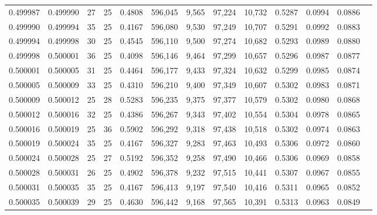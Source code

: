 \begin{tabular}{rrrrrrrrrrrrr}
0.499987 & 0.499990 &    27 &  25 &                                     0.4808 & 596,045 &   9,565 &  97,224 &  10,732 & 0.5287 & 0.0994 & 0.0886 \\
0.499990 & 0.499994 &    35 &  25 &                                     0.4167 & 596,080 &   9,530 &  97,249 &  10,707 & 0.5291 & 0.0992 & 0.0883 \\
0.499994 & 0.499998 &    30 &  25 &                                     0.4545 & 596,110 &   9,500 &  97,274 &  10,682 & 0.5293 & 0.0989 & 0.0880 \\
0.499998 & 0.500001 &    36 &  25 &                                     0.4098 & 596,146 &   9,464 &  97,299 &  10,657 & 0.5296 & 0.0987 & 0.0877 \\
0.500001 & 0.500005 &    31 &  25 &                                     0.4464 & 596,177 &   9,433 &  97,324 &  10,632 & 0.5299 & 0.0985 & 0.0874 \\
0.500005 & 0.500009 &    33 &  25 &                                     0.4310 & 596,210 &   9,400 &  97,349 &  10,607 & 0.5302 & 0.0983 & 0.0871 \\
0.500009 & 0.500012 &    25 &  28 &                                     0.5283 & 596,235 &   9,375 &  97,377 &  10,579 & 0.5302 & 0.0980 & 0.0868 \\
0.500012 & 0.500016 &    32 &  25 &                                     0.4386 & 596,267 &   9,343 &  97,402 &  10,554 & 0.5304 & 0.0978 & 0.0865 \\
0.500016 & 0.500019 &    25 &  36 &                                     0.5902 & 596,292 &   9,318 &  97,438 &  10,518 & 0.5302 & 0.0974 & 0.0863 \\
0.500019 & 0.500024 &    35 &  25 &                                     0.4167 & 596,327 &   9,283 &  97,463 &  10,493 & 0.5306 & 0.0972 & 0.0860 \\
0.500024 & 0.500028 &    25 &  27 &                                     0.5192 & 596,352 &   9,258 &  97,490 &  10,466 & 0.5306 & 0.0969 & 0.0858 \\
0.500028 & 0.500031 &    26 &  25 &                                     0.4902 & 596,378 &   9,232 &  97,515 &  10,441 & 0.5307 & 0.0967 & 0.0855 \\
0.500031 & 0.500035 &    35 &  25 &                                     0.4167 & 596,413 &   9,197 &  97,540 &  10,416 & 0.5311 & 0.0965 & 0.0852 \\
0.500035 & 0.500039 &    29 &  25 &                                     0.4630 & 596,442 &   9,168 &  97,565 &  10,391 & 0.5313 & 0.0963 & 0.0849 \\

\end{tabular}
